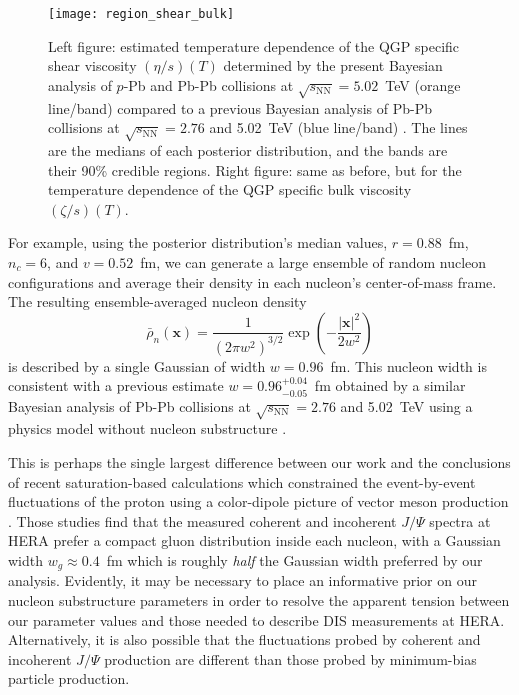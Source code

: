 \documentclass[aps,prc,reprint,amsmath,nofootinbib]{revtex4-1}
\newcommand{\sqrts}{\sqrt{s_\mathrm{NN}}}
\newcommand{\xv}{\mathbf x}
\begin{document}
\begin{figure}
  \texttt{[image: region\_shear\_bulk]}
  \caption{
    \label{fig:region_shear_bulk}
    Left figure: estimated temperature dependence of the QGP specific shear viscosity $(\eta/s)(T)$ determined by the present Bayesian analysis of $p$-Pb and Pb-Pb collisions at $\sqrts=5.02$~TeV (orange line/band) compared to a previous Bayesian analysis of Pb-Pb collisions at $\sqrts=2.76$ and 5.02~TeV (blue line/band) \cite{Bernhard:2018hnz}.
    The lines are the medians of each posterior distribution, and the bands are their 90\% credible regions.
    Right figure: same as before, but for the temperature dependence of the QGP specific bulk viscosity $(\zeta/s)(T)$.
  }
\end{figure}

For example, using the posterior distribution's median values, $r=0.88$~fm, $n_c=6$, and $v=0.52$~fm, we can generate a large ensemble of random nucleon configurations and average their density in each nucleon's center-of-mass frame.
The resulting ensemble-averaged nucleon density
\begin{equation}
  \bar{\rho}_n(\xv) = \frac{1}{(2 \pi w^2)^{3/2}} \exp \left( -\frac{|\xv|^2}{2 w^2} \right)
\end{equation}
is described by a single Gaussian of width $w = 0.96$~fm.
This nucleon width is consistent with a previous estimate $w = 0.96_{-0.05}^{+0.04}$~fm obtained by a similar Bayesian analysis of Pb-Pb collisions at $\sqrts=2.76$ and 5.02~TeV using a physics model without nucleon substructure \cite{Bernhard:2018hnz}.

This is perhaps the single largest difference between our work and the conclusions of recent saturation-based calculations which constrained the event-by-event fluctuations of the proton using a color-dipole picture of vector meson production \cite{Mantysaari:2016ykx, Mantysaari:2016jaz}.
Those studies find that the measured coherent and incoherent $J/\Psi$ spectra at HERA prefer a compact gluon distribution inside each nucleon, with a Gaussian width $w_g \approx 0.4$~fm which is roughly \emph{half} the Gaussian width preferred by our analysis.
Evidently, it may be necessary to place an informative prior on our nucleon substructure parameters in order to resolve the apparent tension between our parameter values and those needed to describe DIS measurements at HERA.
Alternatively, it is also possible that the fluctuations probed by coherent and incoherent $J/\Psi$ production are different than those probed by minimum-bias particle production.
\end{document}
